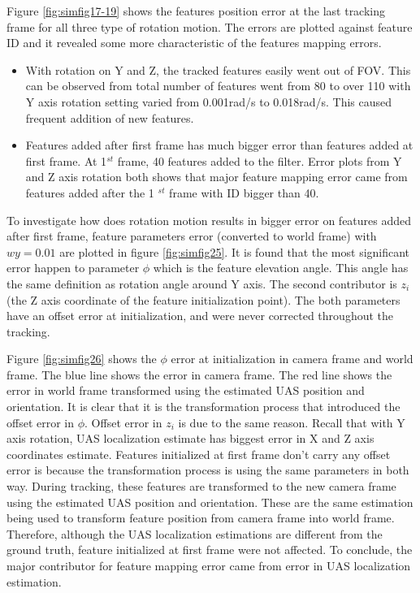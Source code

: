 Figure \ref{fig:simfig17-19} shows the features position error at the last
tracking frame for all three type of rotation motion. The errors are
plotted against feature ID and it revealed some more characteristic of
the features mapping errors.

\begin{itemize}
  \item With rotation on Y and Z, the tracked features easily went out
  of FOV. This can be observed from total number of features went from
  80 to over 110 with Y axis rotation setting varied from 0.001rad/s
  to 0.018rad/s. This caused frequent addition of new features.
  \item Features added after first frame has much bigger error than
  features added at first frame. At 1$^{st}$ frame, 40 features added
  to the filter. Error plots from Y and Z axis rotation both shows
  that major feature mapping error came from features added after the
  1 $^{st}$ frame with ID bigger than 40.
\end{itemize}

To investigate how does rotation motion results in bigger error on
features added after first frame, feature parameters error (converted
to world frame) with $wy = 0.01$ are plotted in
figure \ref{fig:simfig25}. It is found that the most significant
error happen to parameter $\phi$ which is the feature elevation angle.
This angle has the same definition as rotation angle around Y axis.
The second contributor is $z_i$ (the Z axis coordinate of the feature
initialization point). The both parameters have an offset error at
initialization, and were never corrected throughout the tracking.

Figure \ref{fig:simfig26} shows the $\phi$ error at 
initialization in camera frame and world frame. The blue line shows the 
error in camera frame. The red line shows the error in world frame 
transformed using the estimated UAS position and orientation. It is 
clear that it is the transformation process that introduced the offset 
error in $\phi$. Offset error in $z_i$ is due to the same 
reason. Recall that with Y axis rotation, UAS localization estimate has 
biggest error in X and Z axis coordinates estimate. Features initialized 
at first frame don't carry any offset error is because the 
transformation process is using the same parameters in both way. During 
tracking, these features are transformed to the new camera frame using 
the estimated UAS position and orientation. These are the same 
estimation being used to transform feature position from camera frame 
into world frame. Therefore, although the UAS localization estimations 
are different from the ground truth, feature initialized at first frame 
were not affected. To conclude, the major contributor for feature 
mapping error came from error in UAS localization estimation.

